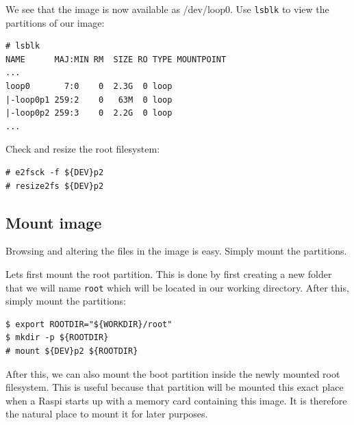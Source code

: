 We see that the image is now available as /dev/loop0. Use \texttt{lsblk}
to view the partitions of our image:

\begin{lstlisting}[]
# lsblk
NAME      MAJ:MIN RM  SIZE RO TYPE MOUNTPOINT
...
loop0       7:0    0  2.3G  0 loop 
|-loop0p1 259:2    0   63M  0 loop 
|-loop0p2 259:3    0  2.2G  0 loop
...
\end{lstlisting}
\FloatBarrier
\vspace{-5mm}

Check and resize the root filesystem:
\begin{lstlisting}[]
# e2fsck -f ${DEV}p2
# resize2fs ${DEV}p2
\end{lstlisting}
\FloatBarrier



\subsection{Mount image}

Browsing and altering the files in the image is easy. Simply mount the partitions.

Lets first mount the root partition. This is done by first creating a new folder
that we will name \texttt{root} which will be located in our working directory.
After this, simply mount the partitions:

\begin{lstlisting}[]
$ export ROOTDIR="${WORKDIR}/root"
$ mkdir -p ${ROOTDIR}
# mount ${DEV}p2 ${ROOTDIR}
\end{lstlisting}
\FloatBarrier
\vspace{-5mm}

After this, we can also mount the boot partition inside the newly mounted
root filesystem. This is useful because that partition will be mounted
this exact place when a \ac{Raspi} starts up with a memory card containing
this image. It is therefore the natural place to mount it for later purposes.

